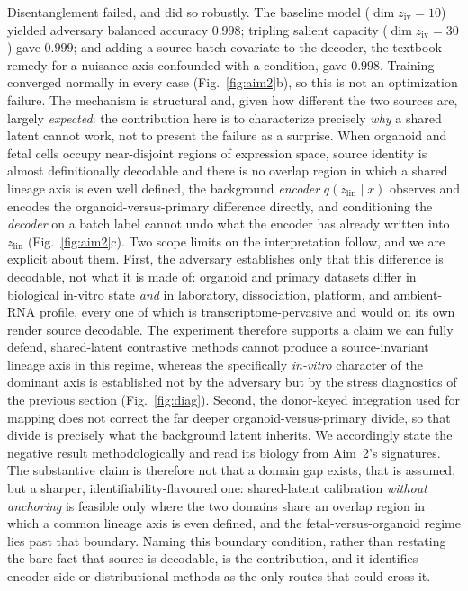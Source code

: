 \documentclass[11pt]{article}
\newcommand{\zlin}{\ensuremath{z_{\mathrm{lin}}}}
\newcommand{\ziv}{\ensuremath{z_{\mathrm{iv}}}}
\begin{document}
Disentanglement failed, and did so robustly. The baseline model
($\dim\ziv=10$) yielded adversary balanced accuracy $0.998$; tripling salient capacity ($\dim\ziv=30$)
gave $0.999$; and adding a source batch covariate to the decoder, the textbook remedy for a nuisance
axis confounded with a condition, gave $0.998$. Training converged normally in every case
(Fig.~\ref{fig:aim2}b), so this is not an optimization failure. The mechanism is structural and, given
how different the two sources are, largely \emph{expected}: the contribution here is to characterize
precisely \emph{why} a shared latent cannot work, not to present the failure as a surprise. When
organoid and fetal cells occupy near-disjoint regions of expression space, source identity is almost
definitionally decodable and there is no overlap region in which a shared lineage axis is even well
defined, the background \emph{encoder} $q(\zlin\!\mid\!x)$ observes and encodes the
organoid-versus-primary difference directly, and conditioning the \emph{decoder} on a batch label cannot
undo what the encoder has already written into \zlin{} (Fig.~\ref{fig:aim2}c). Two scope limits on the
interpretation follow, and we are explicit about them. First, the adversary establishes only that this
difference is decodable, not what it is made of: organoid and primary datasets differ in biological
in-vitro state \emph{and} in laboratory, dissociation, platform, and ambient-RNA profile, every one of
which is transcriptome-pervasive and would on its own render source decodable. The experiment therefore
supports a claim we can fully defend, shared-latent contrastive methods cannot produce a
source-invariant lineage axis in this regime, whereas the specifically \emph{in-vitro} character of the
dominant axis is established not by the adversary but by the stress diagnostics of the previous section
(Fig.~\ref{fig:diag}). Second, the donor-keyed integration used for mapping does not correct the far
deeper organoid-versus-primary divide, so that divide is precisely what the background latent inherits.
We accordingly state the negative result methodologically and read its biology from Aim~2's signatures.
The substantive claim is therefore not that a domain gap exists, that is assumed, but a sharper,
identifiability-flavoured one: shared-latent calibration \emph{without anchoring} is feasible only where
the two domains share an overlap region in which a common lineage axis is even defined, and the
fetal-versus-organoid regime lies past that boundary. Naming this boundary condition, rather than
restating the bare fact that source is decodable, is the contribution, and it identifies encoder-side
or distributional methods as the only routes that could cross it.
\end{document}
